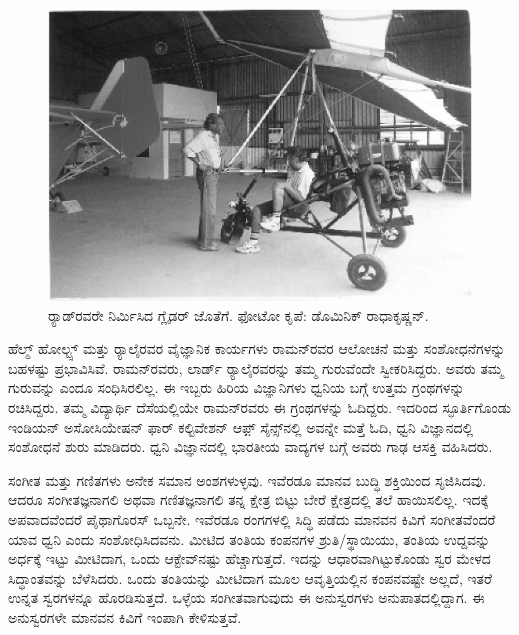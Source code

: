 \begin{figure}[!htpb]
\centering
\includegraphics[scale=0.215]{"images/21.jpg"}
\caption{ರ‍್ಯಾಡ್‍ರವರೇ ನಿರ್ಮಿಸಿದ ಗ್ಲೈಡರ್ ಜೊತೆಗೆ. ಫೋಟೋ ಕೃಪೆ: ಡೊಮಿನಿಕ್ ರಾಧಾಕೃಷ್ಣನ್.}\label{chap5-fig06}
\end{figure}



ಹೆಲ್ಮ್ ‍ಹೋಲ್ಟ್ಸ್ ಮತ್ತು ರ‍್ಯಾಲೈರವರ ವೈಜ್ಞಾನಿಕ ಕಾರ್ಯಗಳು ರಾಮನ್‍ರವರ ಆಲೋಚನೆ ಮತ್ತು ಸಂಶೋಧನೆಗಳನ್ನು ಬಹಳಷ್ಟು ಪ್ರಭಾವಿಸಿವೆ. ರಾಮನ್‍ರವರು, ಲಾರ್ಡ್ ರ‍್ಯಾಲೈರವರನ್ನು ತಮ್ಮ ಗುರುವೆಂದೇ ಸ್ವೀಕರಿಸಿದ್ದರು. ಅವರು ತಮ್ಮ ಗುರುವನ್ನು ಎಂದೂ ಸಂಧಿಸಿರಲಿಲ್ಲ. ಈ ಇಬ್ಬರು ಹಿರಿಯ ವಿಜ್ಞಾನಿಗಳು ಧ್ವನಿಯ ಬಗ್ಗೆ ಉತ್ತಮ ಗ್ರಂಥಗಳನ್ನು ರಚಿಸಿದ್ದರು. ತಮ್ಮ ವಿದ್ಯಾರ್ಥಿ ದೆಸೆಯಲ್ಲಿಯೇ ರಾಮನ್‍ರವರು ಈ ಗ್ರಂಥಗಳನ್ನು ಓದಿದ್ದರು. ಇದರಿಂದ ಸ್ಫೂರ್ತಿಗೊಂಡು ಇಂಡಿಯನ್ ಅಸೋಸಿಯೇಷನ್ ಫಾರ್ ಕಲ್ಟಿವೇಶನ್ ಆಫ಼್ ಸೈನ್ಸ್‌ನಲ್ಲಿ ಅವನ್ನೇ ಮತ್ತೆ ಓದಿ, ಧ್ವನಿ ವಿಜ್ಞಾನದಲ್ಲಿ ಸಂಶೋಧನೆ ಶುರು ಮಾಡಿದರು. ಧ್ವನಿ ವಿಜ್ಞಾನದಲ್ಲಿ ಭಾರತೀಯ ವಾದ್ಯಗಳ ಬಗ್ಗೆ ಅವರು ಗಾಢ ಆಸಕ್ತಿ ವಹಿಸಿದರು.

ಸಂಗೀತ ಮತ್ತು ಗಣಿತಗಳು ಅನೇಕ ಸಮಾನ ಅಂಶಗಳುಳ್ಳವು. ಇವೆರಡೂ ಮಾನವ ಬುದ್ಧಿ ಶಕ್ತಿಯಿಂದ ಸೃಜಿಸಿದವು. ಆದರೂ ಸಂಗೀತಜ್ಞನಾಗಲಿ ಅಥವಾ ಗಣಿತಜ್ಞನಾಗಲಿ ತನ್ನ ಕ್ಷೇತ್ರ ಬಿಟ್ಟು ಬೇರೆ ಕ್ಷೇತ್ರದಲ್ಲಿ ತಲೆ ಹಾಯಿಸಲಿಲ್ಲ. ಇದಕ್ಕೆ ಅಪವಾದವೆಂದರೆ ಪೈಥಾಗೊರಸ್ ಒಬ್ಬನೇ. ಇವೆರಡೂ ರಂಗಗಳಲ್ಲಿ ಸಿದ್ಧಿ ಪಡೆದು ಮಾನವನ ಕಿವಿಗೆ ಸಂಗೀತವೆಂದರೆ ಯಾವ ಧ್ವನಿ ಎಂದು ಸಂಶೋಧಿಸಿದವನು. ಮೀಟಿದ ತಂತಿಯ ಕಂಪನಗಳ ಶ್ರುತಿ/ಸ್ಥಾಯಿಯು, ತಂತಿಯ ಉದ್ದವನ್ನು ಅರ್ಧಕ್ಕೆ ಇಟ್ಟು ಮೀಟಿದಾಗ, ಒಂದು ಆಕ್ಟೇವ್‍ನಷ್ಟು ಹೆಚ್ಚಾಗುತ್ತದೆ. ಇದನ್ನು ಆಧಾರವಾಗಿಟ್ಟುಕೊಂಡು ಸ್ವರ ಮೇಳದ ಸಿದ್ಧಾಂತವನ್ನು ಬೆಳೆಸಿದರು. ಒಂದು ತಂತಿಯನ್ನು ಮೀಟಿದಾಗ ಮೂಲ ಆವೃತ್ತಿಯಲ್ಲಿನ ಕಂಪನವಷ್ಟೇ ಅಲ್ಲದೆ, ಇತರೆ ಉನ್ನತ ಸ್ವರಗಳನ್ನೂ ಹೊರಡಿಸುತ್ತದೆ. ಒಳ್ಳೆಯ ಸಂಗೀತವಾಗುವುದು ಈ ಅನುಸ್ವರಗಳು  ಅನುಪಾತದಲ್ಲಿದ್ದಾಗ. ಈ ಅನುಸ್ವರಗಳೇ ಮಾನವನ ಕಿವಿಗೆ ಇಂಪಾಗಿ ಕೇಳಿಸುತ್ತವೆ.

